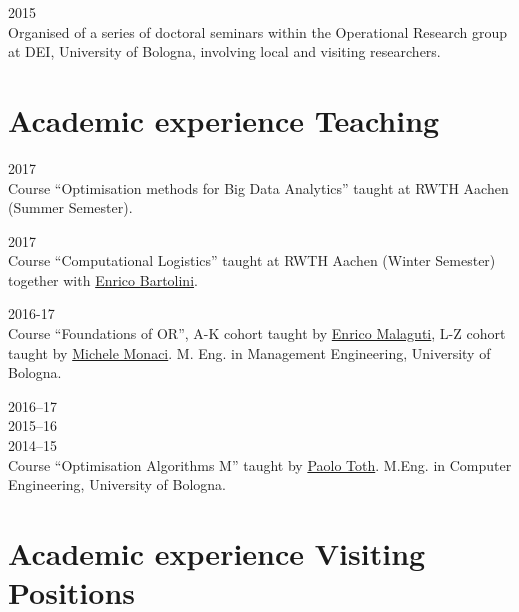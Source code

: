 \begin{paracol}{2}
  \textsc{2015}
\switchcolumn
  \\
  Organised of a series of doctoral seminars within the Operational Research group at DEI, University of Bologna, involving local and visiting researchers.
\end{paracol}

\section*{Academic experience {\small Teaching}}

\begin{paracol}{2}
  \textsc{2017}
\switchcolumn
  \\
  Course ``Optimisation methods for Big Data Analytics'' taught at RWTH Aachen (Summer Semester).
\end{paracol}

\begin{paracol}{2}
  \textsc{2017}
\switchcolumn
  \\
  Course ``Computational Logistics'' taught at RWTH Aachen (Winter Semester) together with \href{https://scholar.google.it/citations?user=RVKwpQsAAAAJ}{Enrico Bartolini}.
\end{paracol}

\begin{paracol}{2}
  \textsc{2016-17}
\switchcolumn
  \\
  Course ``Foundations of OR'', A-K cohort taught by \href{https://scholar.google.com/citations?user=3nD4vYkAAAAJ}{Enrico Malaguti}, L-Z cohort taught by \href{https://scholar.google.com/citations?user=wORMYBMAAAAJ}{Michele Monaci}. M. Eng. in Management Engineering, University of Bologna.
\end{paracol}

\begin{paracol}{2}
  \textsc{2016--17\\2015--16\\2014--15}
\switchcolumn
  \\
  Course ``Optimisation Algorithms M'' taught by \href{https://scholar.google.com/citations?user=2IPL4XIAAAAJ}{Paolo Toth}. M.Eng. in Computer Engineering, University of Bologna.
\end{paracol}

\section*{Academic experience {\small Visiting Positions}}

